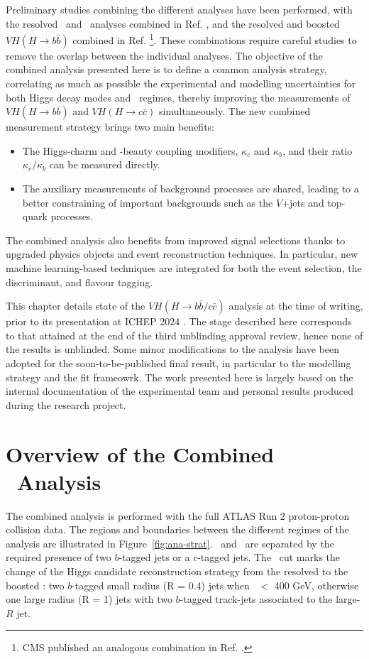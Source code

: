 Preliminary studies combining the different analyses have been performed, with the resolved \vhb\ and \vhc\ analyses combined in Ref. \cite{Collaboration:2721696}, and the resolved and boosted $VH (H \rightarrow b\bar{b})$ combined in Ref. \cite{ATLAS:2021wqh}\footnote{CMS published an analogous combination in Ref. \cite{CMS-PAS-HIG-20-001}.}. These combinations require careful studies to remove the overlap between the individual analyses. The objective of the combined analysis presented here is to define a common analysis strategy, correlating as much as possible the experimental and modelling uncertainties for both Higgs decay modes and \ptv\ regimes, thereby improving the measurements of $VH (H \rightarrow b\bar{b})$ and $VH (H \rightarrow c\bar{c})$ simultaneously. The new combined measurement strategy brings two main benefits: 
\begin{itemize}
\item The Higgs-charm and -beauty coupling modifiers, $\kappa_c$ and $\kappa_b$, and their ratio $\kappa_c/\kappa_b$ can be measured directly. 
\item The auxiliary measurements of background processes are shared, leading to a better constraining of important backgrounds such as the $V$+jets and top-quark processes.
\end{itemize}
The combined analysis also benefits from improved signal selections thanks to upgraded physics objects and event reconstruction techniques. In particular, new machine learning-based techniques are integrated for both the event selection, the discriminant, and flavour tagging.

This chapter details state of the $VH (H\rightarrow b\bar{b}/c\bar{c})$ analysis at the time of writing, prior to its presentation at ICHEP 2024 \cite{ATLAS-CONF-2024-010}. The stage described here corresponds to that attained at the end of the third unblinding approval review, hence none of the results is unblinded. Some minor modifications to the analysis have been adopted for the soon-to-be-published final result, in particular to the modelling strategy and the fit frameowrk. The work presented here is largely based on the internal documentation of the experimental team and personal results produced during the research project. 

\section[Overview of the Combined \vhbc\ Analysis]{Overview of the Combined \boldvhbc\ Analysis}
The combined analysis is performed with the full ATLAS Run 2 proton-proton collision data. The regions and boundaries between the different regimes of the analysis are illustrated in Figure~\ref{fig:ana-strat}. \vhb\ and \vhc\ are separated by the required presence of two $b$-tagged jets or a $c$-tagged jets. The \ptv\ cut marks the change of the Higgs candidate reconstruction strategy from the resolved to the boosted \vhb: two $b$-tagged small radius (R = 0.4) jets when \ptv\ $<$ 400 GeV, otherwise one large radius (R = 1) jets with two $b$-tagged track-jets associated to the large-$R$ jet.

